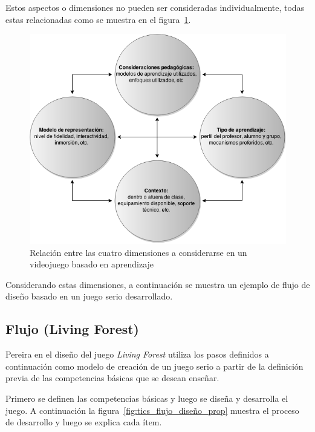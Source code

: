 Estos aspectos o dimensiones no pueden ser consideradas individualmente, todas estas relacionadas  como se muestra en el figura~\ref{fig:desarrollo_dimensiones}.

\begin{figure}[H]
\centering
\includegraphics[scale=0.5]{juegos_serios/desarrollo_dimensiones.png}
\caption{Relación entre las cuatro dimensiones a considerarse en un videojuego basado en aprendizaje}
\label{fig:desarrollo_dimensiones}
\end{figure}

Considerando estas dimensiones, a continuación se muestra un ejemplo de flujo de diseño basado en un juego serio desarrollado.


\subsection{Flujo (Living Forest)}


Pereira\cite{pereira2009design} en el diseño del juego \emph{Living Forest} utiliza los pasos definidos a continuación como modelo de creación de un juego serio a partir de la definición previa de las competencias básicas que se desean enseñar.

Primero se definen las competencias básicas y luego se diseña y desarrolla el juego. A continuación la figura~\ref{fig:tics_flujo_diseño_prop} muestra el proceso de desarrollo y luego se explica cada ítem.

